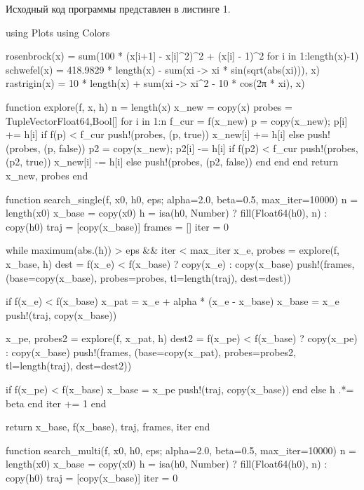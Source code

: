 \documentclass[a4paper, 14pt]{extarticle}
\begin{document}
Исходный код программы представлен в листинге 1.

\begin{breakablelisting}
using Plots
using Colors

rosenbrock(x) = sum(100 * (x[i+1] - x[i]^2)^2 + (x[i] - 1)^2 for i in 1:length(x)-1)
schwefel(x) = 418.9829 * length(x) - sum(xi -> xi * sin(sqrt(abs(xi))), x)
rastrigin(x) = 10 * length(x) + sum(xi -> xi^2 - 10 * cos(2π * xi), x)

function explore(f, x, h)
    n = length(x)
    x_new = copy(x)
    probes = Tuple{Vector{Float64},Bool}[]
    for i in 1:n
        f_cur = f(x_new)
        p = copy(x_new); p[i] += h[i]
        if f(p) < f_cur
            push!(probes, (p, true))
            x_new[i] += h[i]
        else
            push!(probes, (p, false))
            p2 = copy(x_new); p2[i] -= h[i]
            if f(p2) < f_cur
                push!(probes, (p2, true))
                x_new[i] -= h[i]
            else
                push!(probes, (p2, false))
            end
        end
    end
    return x_new, probes
end

function search_single(f, x0, h0, eps; alpha=2.0, beta=0.5, max_iter=10000)
    n = length(x0)
    x_base = copy(x0)
    h = isa(h0, Number) ? fill(Float64(h0), n) : copy(h0)
    traj = [copy(x_base)]
    frames = []
    iter = 0

    while maximum(abs.(h)) > eps && iter < max_iter
        x_e, probes = explore(f, x_base, h)
        dest = f(x_e) < f(x_base) ? copy(x_e) : copy(x_base)
        push!(frames, (base=copy(x_base), probes=probes, tl=length(traj), dest=dest))

        if f(x_e) < f(x_base)
            x_pat = x_e + alpha * (x_e - x_base)
            x_base = x_e
            push!(traj, copy(x_base))

            x_pe, probes2 = explore(f, x_pat, h)
            dest2 = f(x_pe) < f(x_base) ? copy(x_pe) : copy(x_base)
            push!(frames, (base=copy(x_pat), probes=probes2, tl=length(traj), dest=dest2))

            if f(x_pe) < f(x_base)
                x_base = x_pe
                push!(traj, copy(x_base))
            end
        else
            h .*= beta
        end
        iter += 1
    end

    return x_base, f(x_base), traj, frames, iter
end

function search_multi(f, x0, h0, eps; alpha=2.0, beta=0.5, max_iter=10000)
    n = length(x0)
    x_base = copy(x0)
    h = isa(h0, Number) ? fill(Float64(h0), n) : copy(h0)
    traj = [copy(x_base)]
    iter = 0


\end{breakablelisting}
\end{document}
